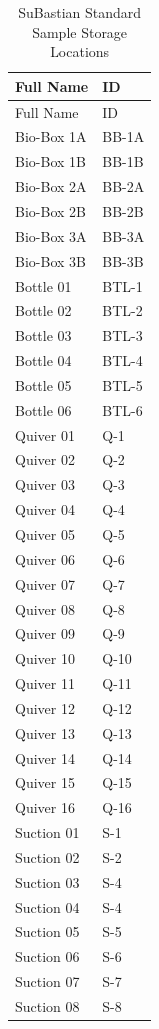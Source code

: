 \documentclass[
  letterpaper,
  DIV=11,
  numbers=noendperiod]{scrreprt}
\begin{document}
\begin{longtable}[]{@{}ll@{}}
\caption{SuBastian Standard Sample Storage Locations}\tabularnewline
\toprule()
Full Name & ID \\
\midrule()
\endfirsthead
\toprule()
Full Name & ID \\
\midrule()
\endhead
Bio-Box 1A & BB-1A \\
Bio-Box 1B & BB-1B \\
Bio-Box 2A & BB-2A \\
Bio-Box 2B & BB-2B \\
Bio-Box 3A & BB-3A \\
Bio-Box 3B & BB-3B \\
Bottle 01 & BTL-1 \\
Bottle 02 & BTL-2 \\
Bottle 03 & BTL-3 \\
Bottle 04 & BTL-4 \\
Bottle 05 & BTL-5 \\
Bottle 06 & BTL-6 \\
Quiver 01 & Q-1 \\
Quiver 02 & Q-2 \\
Quiver 03 & Q-3 \\
Quiver 04 & Q-4 \\
Quiver 05 & Q-5 \\
Quiver 06 & Q-6 \\
Quiver 07 & Q-7 \\
Quiver 08 & Q-8 \\
Quiver 09 & Q-9 \\
Quiver 10 & Q-10 \\
Quiver 11 & Q-11 \\
Quiver 12 & Q-12 \\
Quiver 13 & Q-13 \\
Quiver 14 & Q-14 \\
Quiver 15 & Q-15 \\
Quiver 16 & Q-16 \\
Suction 01 & S-1 \\
Suction 02 & S-2 \\
Suction 03 & S-4 \\
Suction 04 & S-4 \\
Suction 05 & S-5 \\
Suction 06 & S-6 \\
Suction 07 & S-7 \\
Suction 08 & S-8 \\
\bottomrule()
\end{longtable}
\end{document}
